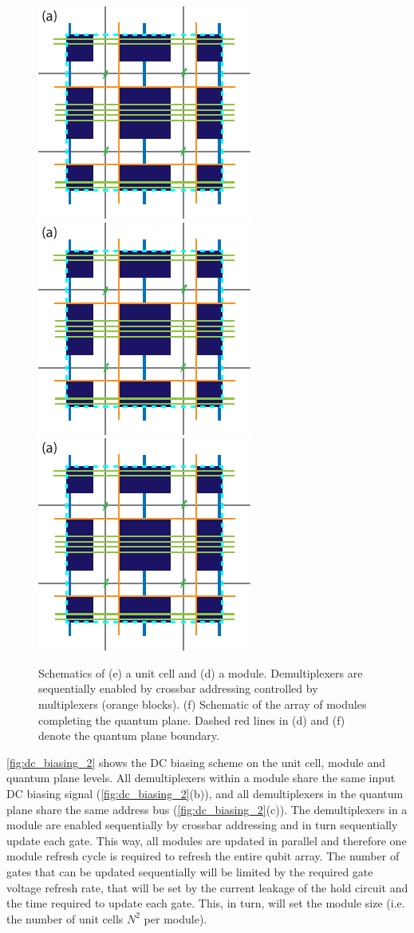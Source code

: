 \documentclass[aps,prl,reprint,superscriptaddress,floatfix]{revtex4-1}
\begin{document}
\begin{figure}[t]
    \centering
    \includegraphics[height=0.275\textwidth,page=1]{Figure_4_DC_biasing_2.pdf}
    \includegraphics[height=0.275\textwidth,page=2]{Figure_4_DC_biasing_2.pdf}
    \includegraphics[height=0.275\textwidth,page=3]{Figure_4_DC_biasing_2.pdf}
    \caption{Schematics of (e) a unit cell and (d) a module. Demultiplexers are sequentially enabled by crossbar addressing controlled by multiplexers (orange blocks). (f) Schematic of the array of modules completing the quantum plane. Dashed red lines in (d) and (f) denote the quantum plane boundary.}
    \label{fig:dc_biasing_2}
\end{figure}

\autoref{fig:dc_biasing_2} shows the DC biasing scheme on the unit cell, module and quantum plane levels.
All demultiplexers within a module share the same input DC biasing signal (\autoref{fig:dc_biasing_2}(b)), and all demultiplexers in the quantum plane share the same address bus (\autoref{fig:dc_biasing_2}(c)).
The demultiplexers in a module are enabled sequentially by crossbar addressing and in turn sequentially update each gate. This way, all modules are updated in parallel and therefore one module refresh cycle is required to refresh the entire qubit array.
The number of gates that can be updated sequentially will be limited by the required gate voltage refresh rate, that will be set by the current leakage of the hold circuit and the time required to update each gate.
This, in turn, will set the module size (i.e. the number of unit cells $N^2$ per module).
\end{document}
